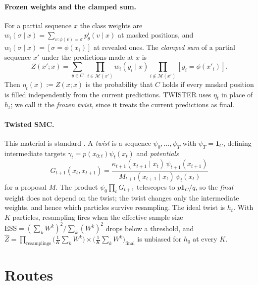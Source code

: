 \documentclass[11pt]{article}
\theoremstyle{definition}
\newcommand{\M}{\mathcal{M}}
\newcommand{\one}{\mathbf{1}}
\newcommand{\Zh}{\widehat Z}
\begin{document}
\paragraph{Frozen weights and the clamped sum.}
For a partial sequence $x$ the class weights are $w_i(\sigma\mid x)=\sum_{v:\phi(v)=\sigma}p^i_\theta(v\mid x)$ at
masked positions, and $w_i(\sigma\mid x)=[\sigma=\phi(x_i)]$ at revealed ones. The \emph{clamped sum} of a partial
sequence $x'$ under the predictions made at $x$ is
\begin{equation}\label{eq:clamped}
  Z(x';x)=\sum_{y\in C}\ \prod_{i\in\M(x')}w_i(y_i\mid x)\prod_{i\notin\M(x')}[y_i=\phi(x'_i)].
\end{equation}
Then $\eta_t(x):=Z(x;x)$ is the probability that $C$ holds if every masked position is filled independently from
the current predictions. TWISTER uses $\eta_t$ in place of $h_t$; we call it the \emph{frozen twist}, since it
treats the current predictions as final.

\paragraph{Twisted SMC.}
This material is standard \cite{delmoral2004}. A \emph{twist} is a sequence $\psi_0,\dots,\psi_T$ with
$\psi_T=\one_C$, defining intermediate targets $\gamma_t=p(x_{0:t})\psi_t(x_t)$ and \emph{potentials}
\begin{equation}\label{eq:G}
  G_{t+1}(x_t,x_{t+1})=\frac{\kappa_{t+1}(x_{t+1}\mid x_t)\,\psi_{t+1}(x_{t+1})}
                           {M_{t+1}(x_{t+1}\mid x_t)\,\psi_t(x_t)}
\end{equation}
for a proposal $M$. The product $\psi_0\prod_tG_{t+1}$ telescopes to $p\one_C/q$, so the \emph{final} weight does
not depend on the twist; the twist changes only the intermediate weights, and hence which particles survive
resampling. The ideal twist is $h_t$. With $K$ particles, resampling fires when the effective sample size
$\mathrm{ESS}=(\sum_kW^k)^2/\sum_k(W^k)^2$ drops below a threshold, and
$\Zh=\prod_{\text{resamplings}}\big(\tfrac1K\sum_kW^k\big)\times\big(\tfrac1K\sum_kW^k\big)_{\text{final}}$
is unbiased for $h_0$ at every $K$.

\section{Routes}\label{sec:routes}
\end{document}
